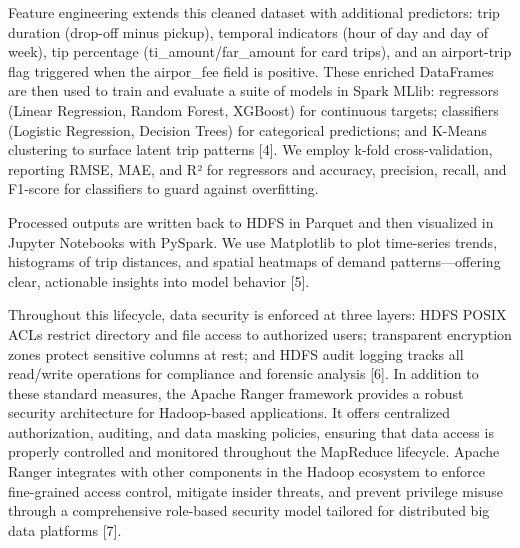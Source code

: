 \documentclass[conference]{IEEEtran}
\begin{document}
Feature engineering extends this cleaned dataset with additional predictors: trip duration (drop-off minus pickup), temporal indicators (hour of day and day of week), tip percentage (ti\_amount/far\_amount for card trips), and an airport-trip flag triggered when the airpor\_fee field is positive. These enriched DataFrames are then used to train and evaluate a suite of models in Spark MLlib: regressors (Linear Regression, Random Forest, XGBoost) for continuous targets; classifiers (Logistic Regression, Decision Trees) for categorical predictions; and K-Means clustering to surface latent trip patterns [4]. We employ k-fold cross-validation, reporting RMSE, MAE, and R² for regressors and accuracy, precision, recall, and F1-score for classifiers to guard against overfitting.

Processed outputs are written back to HDFS in Parquet and then visualized in Jupyter Notebooks with PySpark. We use Matplotlib to plot time-series trends, histograms of trip distances, and spatial heatmaps of demand patterns—offering clear, actionable insights into model behavior [5].

Throughout this lifecycle, data security is enforced at three layers: HDFS POSIX ACLs restrict directory and file access to authorized users; transparent encryption zones protect sensitive columns at rest; and HDFS audit logging tracks all read/write operations for compliance and forensic analysis [6]. In addition to these standard measures, the Apache Ranger framework provides a robust security architecture for Hadoop-based applications. It offers centralized authorization, auditing, and data masking policies, ensuring that data access is properly controlled and monitored throughout the MapReduce lifecycle. Apache Ranger integrates with other components in the Hadoop ecosystem to enforce fine-grained access control, mitigate insider threats, and prevent privilege misuse through a comprehensive role-based security model tailored for distributed big data platforms [7].
\end{document}
